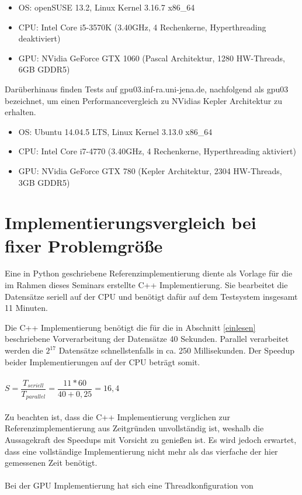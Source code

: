 \begin{itemize}
\item OS: openSUSE 13.2, Linux Kernel 3.16.7 x86\_64
\item CPU: Intel Core i5-3570K (3.40GHz, 4 Rechenkerne, Hyperthreading deaktiviert)
\item GPU: NVidia GeForce GTX 1060 (Pascal Architektur, 1280 HW-Threads, 6GB GDDR5)
\end{itemize}

Darüberhinaus finden Tests auf gpu03.inf-ra.uni-jena.de, nachfolgend als gpu03 bezeichnet, um einen Performancevergleich zu NVidias Kepler Architektur zu erhalten.

\begin{itemize}
\item OS: Ubuntu 14.04.5 LTS, Linux Kernel 3.13.0 x86\_64
\item CPU: Intel Core i7-4770 (3.40GHz, 4 Rechenkerne, Hyperthreading aktiviert)
\item GPU: NVidia GeForce GTX 780 (Kepler Architektur, 2304 HW-Threads, 3GB GDDR5)
\end{itemize}

\section{Implementierungsvergleich bei fixer Problemgröße}
Eine in Python geschriebene Referenzimplementierung diente als Vorlage für die im Rahmen dieses Seminars erstellte C++ Implementierung. Sie bearbeitet die Datensätze seriell auf der CPU und benötigt dafür auf dem Testsystem insgesamt 11 Minuten.

Die C++ Implementierung benötigt die für die in Abschnitt \ref{einlesen} beschriebene Vorverarbeitung der Datensätze 40 Sekunden. Parallel verarbeitet werden die $2^{17}$ Datensätze schnellstenfalls in ca. 250 Millisekunden.
Der Speedup beider Implementierungen auf der CPU beträgt somit.
\\\\
$S = \dfrac{T_{seriell}}{T_{parallel}} = \dfrac{11*60}{40+0,25} = 16,4$
\\\\
Zu beachten ist, dass die C++ Implementierung verglichen zur Referenzimplementierung aus Zeitgründen unvollständig ist, weshalb die Aussagekraft des Speedups mit Vorsicht zu genießen ist. Es wird jedoch erwartet, dass eine vollständige Implementierung nicht mehr als das vierfache der hier gemessenen Zeit benötigt.
\\\\
Bei der GPU Implementierung hat sich eine Threadkonfiguration von

